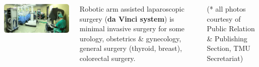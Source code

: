 \documentclass[25pt,a1paper]{tikzposter}
\begin{document}
\begin{columns}
{%
\begin{tikzfigure}
\includegraphics[width=\linewidth]{TMWH_daVinci.jpg}
\end{tikzfigure}


Robotic arm assisted laparoscopic surgery (\textbf{da Vinci system}) is minimal invasive surgery for some
urology, obstetrics & gynecology, general surgery (thyroid, breast), colorectal surgery.

{\tiny (* all photos courtesy of Public Relation \& Publishing Section, TMU Secretariat)}

}
\end{columns}


\end{document}
